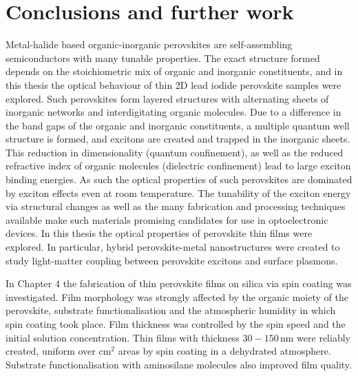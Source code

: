 
\chapter{Conclusions and further work}

\graphicspath{{Chapter8/Figures/}}

Metal-halide based organic-inorganic perovskites are self-assembling semiconductors with many tunable properties. The exact structure formed depends on the stoichiometric mix of organic and inorganic constituents, and in this thesis the optical behaviour of thin 2D lead iodide perovskite samples were explored. Such perovskites form layered structures with alternating sheets of inorganic  networks and interdigitating organic molecules. Due to a difference in the band gaps of the organic and inorganic constituents, a multiple quantum well structure is formed, and excitons are created and trapped in the inorganic sheets. This reduction in dimensionality (quantum confinement), as well as the reduced refractive index of organic molecules (dielectric confinement) lead to large exciton binding energies. As such the optical properties of such perovskites are dominated by exciton effects even at room temperature. The tunability of the exciton energy via structural changes as well as the many fabrication and processing techniques available make such materials promising candidates for use in optoelectronic devices. In this thesis the optical properties of perovskite thin films were explored. In particular, hybrid perovskite-metal nanostructures were created to study light-matter coupling between perovskite excitons and surface plasmons.

In Chapter 4 the fabrication of thin perovskite films on silica via spin coating was investigated. Film morphology was strongly affected by the organic moiety of the perovskite, substrate functionalisation and the atmospheric humidity in which spin coating took place. Film thickness was controlled by the spin speed and the initial solution concentration. Thin films with thickness $30-150$\,nm were reliably created, uniform over cm$^2$ areas by spin coating in a dehydrated atmosphere. Substrate functionalisation with aminosilane molecules also improved film quality.


